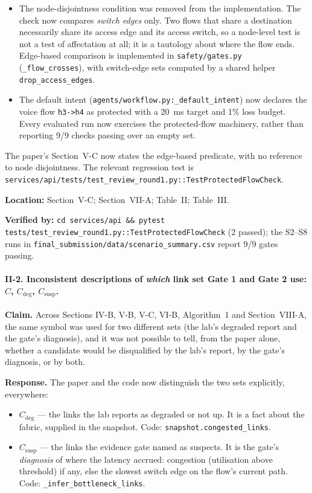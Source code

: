 \documentclass[11pt,a4paper]{article}
\begin{document}
\begin{itemize}
\item The node-disjointness condition was removed from the implementation.
  The check now compares \emph{switch edges} only. Two flows that share a
  destination necessarily share its access edge and its access switch, so a
  node-level test is not a test of affectation at all; it is a tautology about
  where the flow ends. Edge-based comparison is implemented in
  \texttt{safety/gates.py} (\texttt{\_flow\_crosses}), with switch-edge sets
  computed by a shared helper \texttt{drop\_access\_edges}.
\item The default intent (\texttt{agents/workflow.py:\_default\_intent}) now
  declares the voice flow \texttt{h3->h4} as protected with a 20~ms target and
  1\% loss budget. Every evaluated run now exercises the protected-flow
  machinery, rather than reporting 9/9 checks passing over an empty set.
\end{itemize}

The paper's Section~V-C now states the edge-based predicate, with no reference
to node disjointness. The relevant regression test is
\texttt{services/api/tests/test\_review\_round1.py::TestProtectedFlowCheck}.

\textbf{Location:} Section~V-C; Section~VII-A; Table~II; Table~III.

\textbf{Verified by:}
\texttt{cd services/api \&\& pytest tests/test\_review\_round1.py::TestProtectedFlowCheck}
(2 passed); the S2--S8 runs in
\texttt{final\_submission/data/scenario\_summary.csv} report 9/9 gates passing.

\paragraph{II-2. Inconsistent descriptions of \emph{which} link set Gate 1 and
Gate 2 use: $C$, $C_{\mathrm{deg}}$, $C_{\mathrm{susp}}$.}

\textbf{Claim.} Across Sections IV-B, V-B, V-C, VI-B, Algorithm~1 and
Section~VIII-A, the same symbol was used for two different sets (the lab's
degraded report and the gate's diagnosis), and it was not possible to tell,
from the paper alone, whether a candidate would be disqualified by the lab's
report, by the gate's diagnosis, or by both.

\textbf{Response.} The paper and the code now distinguish the two sets
explicitly, everywhere:

\begin{itemize}
\item $C_{\mathrm{deg}}$ --- the links the lab reports as degraded or not up.
  It is a fact about the fabric, supplied in the snapshot. Code:
  \texttt{snapshot.congested\_links}.
\item $C_{\mathrm{susp}}$ --- the links the evidence gate named as suspects.
  It is the gate's \emph{diagnosis} of where the latency accrued: congestion
  (utilisation above threshold) if any, else the slowest switch edge on the
  flow's current path. Code: \texttt{\_infer\_bottleneck\_links}.
\end{itemize}
\end{document}
